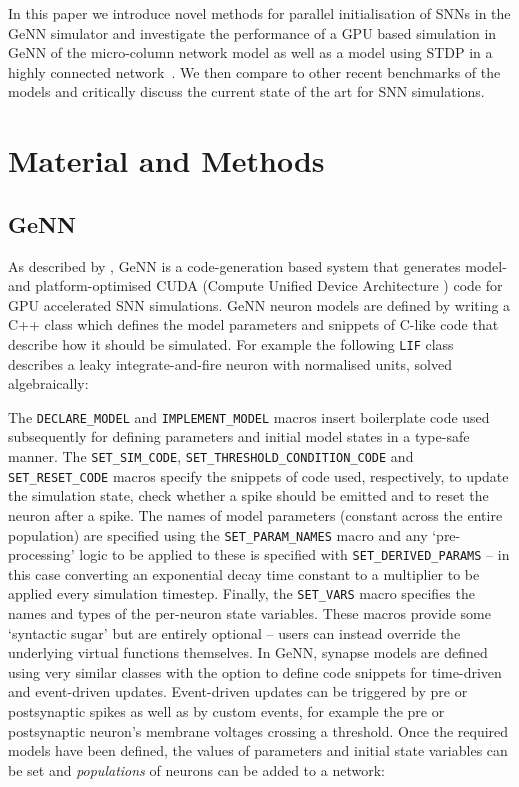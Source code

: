 \documentclass[utf8]{frontiersSCNS} %
\begin{document}
In this paper we introduce novel methods for parallel initialisation of SNNs in the GeNN simulator and investigate the performance of a GPU based simulation in GeNN of the micro-column network model \cite{Potjans2012,VanAlbada2018} as well as a model using STDP in a highly connected network~\citep{Morrison2007}.
We then compare to other recent benchmarks of the models \citep{VanAlbada2018} and critically discuss the current state of the art for SNN simulations.

\section{Material and Methods}
\label{sec:method}
\subsection{GeNN}
\label{sec:method/genn}
As described by \citet{Yavuz2016}, GeNN is a code-generation based system that generates model- and platform-optimised CUDA (Compute Unified Device Architecture \cite{CUDA}) code for GPU accelerated SNN simulations.
GeNN neuron models are defined by writing a C++ class which defines the model parameters and snippets of C-like code that describe how it should be simulated.
For example the following \lstinline{LIF} class describes a leaky integrate-and-fire neuron with normalised units, solved algebraically:



The \lstinline{DECLARE_MODEL} and \lstinline{IMPLEMENT_MODEL} macros insert boilerplate code used subsequently for defining parameters and initial model states in a type-safe manner.
The \lstinline{SET_SIM_CODE}, \lstinline{SET_THRESHOLD_CONDITION_CODE} and \lstinline{SET_RESET_CODE} macros specify the snippets of code used, respectively, to update the simulation state, check whether a spike should be emitted and to reset the neuron after a spike.
The names of model parameters (constant across the entire population) are specified using the \lstinline{SET_PARAM_NAMES} macro and any `pre-processing' logic to be applied to these is specified with \lstinline{SET_DERIVED_PARAMS} -- in this case converting an exponential decay time constant to a multiplier to be applied every simulation timestep.
Finally, the \lstinline{SET_VARS} macro specifies the names and types of the per-neuron state variables.
These macros provide some `syntactic sugar' but are entirely optional -- users can instead override the underlying virtual functions themselves.
In GeNN, synapse models are defined using very similar classes with the option to define code snippets for time-driven and event-driven updates.
Event-driven updates can be triggered by pre or postsynaptic spikes as well as by custom events, for example the pre or postsynaptic neuron's membrane voltages crossing a threshold.
Once the required models have been defined, the values of parameters and initial state variables can be set and \textit{populations} of neurons can be added to a network:
%

\end{document}
